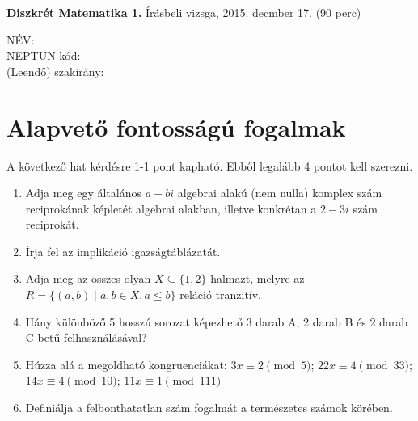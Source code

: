 \documentclass[11pt,a4paper]{article}
\begin{document}
\thispagestyle{empty}

\begin{center}
\begin{large}
\noindent \textbf{Diszkrét Matematika 1.} Írásbeli vizsga, 2015. decmber 17. (90 perc)
\end{large}
\end{center}

{\noindent NÉV: \\ NEPTUN kód:\\ (Leendő) szakirány:\\}
\section{Alapvető fontosságú fogalmak}
A következő hat kérdésre 1-1 pont kapható. Ebből legalább 4 pontot kell szerezni.
\begin{enumerate}\setlength{\itemsep}{3cm}

\item Adja meg egy általános $a+bi$ algebrai alakú (nem nulla) komplex szám reciprokának képletét algebrai alakban, illetve konkrétan a $2-3i$ szám reciprokát. \vspace{-.5cm}
\item Írja fel az implikáció igazságtáblázatát.
\item Adja meg az összes olyan  $X\subseteq \{1, 2 \}$ halmazt, melyre az  $R = \{(a, b)\mid a,b\in X, a\leq b \}$ reláció tranzitív.
\item Hány különböző 5 hosszú sorozat képezhető 3 darab A, 2 darab B és 2 darab C betű felhasználásával?
\item Húzza alá a megoldható kongruenciákat: $3x\equiv 2\pmod 5$;  $22x\equiv 4\pmod 33$;  $14x\equiv 4\pmod {10}$;  $11x\equiv 1\pmod {111}$\vspace{-1.5cm}
\item Definiálja a felbonthatatlan szám fogalmát a természetes számok körében.
\end{enumerate}

\newpage
\end{document}
